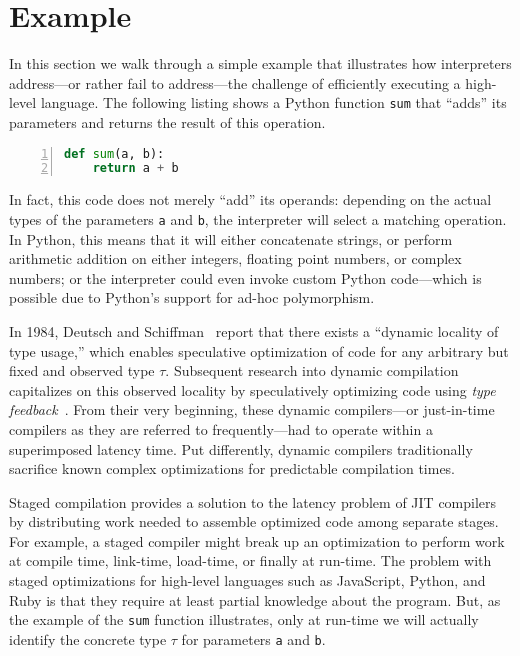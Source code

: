 \documentclass[preprint,10pt]{popl14conf}
\begin{document}
\section{Example}\label{s:example}

In this section we walk through a simple example that illustrates how interpreters address---or
rather fail to address---the challenge of efficiently executing a high-level language.
The following listing shows a Python function \texttt{sum} that ``adds'' its parameters and returns
the result of this operation.
\begin{lstlisting}[language=Python,morekeywords={JUMPTO,DISPATCH,r13},numbers=left,numberstyle=\tiny,style=othercode]
def sum(a, b):
    return a + b
\end{lstlisting}

In fact, this code does not merely ``add'' its operands: depending on the actual types of the
parameters \texttt{a} and \texttt{b}, the interpreter will select a matching operation.
In Python, this means that it will either concatenate strings, or perform arithmetic addition on
either integers, floating point numbers, or complex numbers; or the interpreter could even invoke
custom Python code---which is possible due to Python's support for ad-hoc polymorphism.

In 1984, Deutsch and Schiffman~\cite{deutsch.schiffman+84} report that there exists a ``dynamic
locality of type usage,'' which enables speculative optimization of code for any arbitrary but fixed
and observed type $\tau$.
Subsequent research into dynamic compilation capitalizes on this observed locality by speculatively
optimizing code using \emph{type feedback}~\cite{holzle.ungar+94,holzle+94}.
From their very beginning, these dynamic compilers---or just-in-time compilers as they are referred
to frequently---had to operate within a superimposed latency time.
Put differently, dynamic compilers traditionally sacrifice known complex optimizations for
predictable compilation times.

Staged compilation provides a solution to the latency problem of JIT compilers by distributing work
needed to assemble optimized code among separate stages.
For example, a staged compiler might break up an optimization to perform work at compile time,
link-time, load-time, or finally at run-time.
The problem with staged optimizations for high-level languages such as JavaScript, Python, and Ruby
is that they require at least partial knowledge about the program.
But, as the example of the \texttt{sum} function illustrates, only at run-time we will actually
identify the concrete type $\tau$ for parameters \texttt{a} and \texttt{b}.
\end{document}
